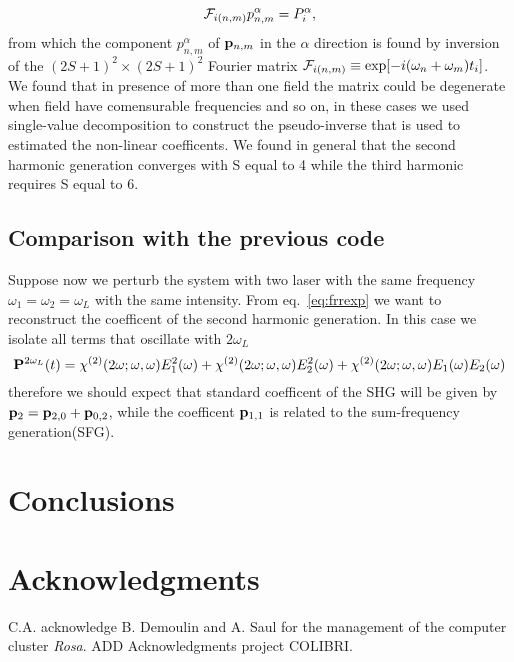\documentclass[submission, Phys]{SciPost}
\newcommand{\pp}{{\bf p}}
\newcommand{\PP}{{\bf P}}
\newcommand{\be}{\begin{equation}}
\newcommand{\ee}{\end{equation}}
\renewcommand{\[}{\left[}
\renewcommand{\]}{\right]}
\renewcommand{\(}{\left(}
\renewcommand{\)}{\right)}
\begin{document}
\be
{\cal F}_{i(n,m)} p^\alpha_{n,m} = P^\alpha_i,
\label{eq:fouinv}
\ee 
from which the component $p^\alpha_{n,m}$ of $\pp_{n,m}$ in the $\alpha$ direction is found by inversion of the $(2S+1)^2\times(2S+1)^2$ Fourier matrix ${\cal F}_{i(n,m)} \equiv \exp[-i(\omega_n +\omega_m)t_i]$. We found that in presence of more than one field the matrix could be degenerate when field have comensurable frequencies and so on, in these cases we used single-value decomposition to construct the pseudo-inverse that is used to estimated the non-linear coefficents. We found in general that the second harmonic generation converges with S equal to 4 while the third harmonic requires S equal to 6.
\subsection{Comparison with the previous code}
Suppose now we perturb the system with two laser with the same frequency $\omega_1 = \omega_2 =\omega_L$ with the same intensity. From eq.~\ref{eq:frrexp} we want to reconstruct the coefficent of the second harmonic generation. In this case we isolate all terms that oscillate with $2\omega_L$
\be
\PP^{2\omega_L}(t) =\chi^{(2)}(2\omega;\omega,\omega) E_1^2(\omega) +\chi^{(2)}(2\omega;\omega,\omega) E_2^2(\omega) + \chi^{(2)}(2\omega;\omega,\omega) E_1(\omega) E_2(\omega)
\ee
therefore we should expect that standard coefficent of the SHG will be given by $\pp_{2}= \pp_{2,0} + \pp_{0,2}$, while the coefficent $\pp_{1,1}$ is related to the sum-frequency generation(SFG).
\section{Conclusions}
\section*{Acknowledgments}
C.A. acknowledge B. Demoulin and  A. Saul for the management of the computer cluster \emph{Rosa}. ADD Acknowledgments project COLIBRI. 
%

\nolinenumbers
\end{document}
